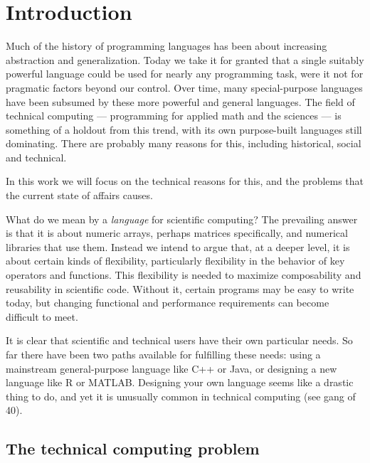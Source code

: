 \chapter{Introduction}

Much of the history of programming languages has been about increasing abstraction
and generalization. Today we take it for granted that a single suitably powerful
language could be used for nearly any programming task, were it not for pragmatic
factors beyond our control. Over time, many special-purpose languages
have been subsumed by these more powerful and general languages.
The field of technical computing --- programming for applied math and the
sciences --- is something of a holdout from this trend, with its own
purpose-built languages still dominating.
There are probably many reasons for this, including historical, social and
technical.

In this work we will focus on the technical reasons for this, and the
problems that the current state of affairs causes.

What do we mean by a \emph{language} for scientific computing?
The prevailing
answer is that it is about numeric arrays, perhaps matrices specifically,
and numerical libraries that use them.
Instead we intend to argue that, at a
deeper level, it is about certain kinds of flexibility, particularly
flexibility in the behavior of key operators and functions. This flexibility
is needed to maximize composability and reusability in scientific code.
Without it, certain programs may be easy to write today, but changing
functional and performance requirements can become difficult to meet.

It is clear that scientific and technical users have their own particular
needs. So far there have been two paths available for fulfilling these
needs: using a mainstream general-purpose language like C++ or Java, or
designing a new language like R or MATLAB. Designing your own language
seems like a drastic thing to do, and yet it is unusually common in
technical computing (see gang of 40).


\section{The technical computing problem}

